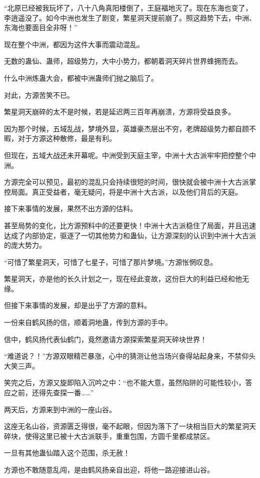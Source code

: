 \begin{this_body}
“北原已经被我玩坏了，八十八角真阳楼倒了，王庭福地灭了。现在东海也变了，李逍遥没了。如今中洲也发生了剧变，繁星洞天提前崩了。照这趋势下去，中洲、东海也要面目全非呀！”

现在整个中洲，都因为这件大事而震动混乱。

无数的蛊仙、蛊师，超级势力，大中小势力，都朝着洞天碎片世界蜂拥而去。

什么中洲炼蛊大会，都被中洲蛊师们抛之脑后了。

对此，方源苦笑不已。

繁星洞天崩碎的太不是时候，若是延迟两三百年再崩溃，方源将受益良多。

因为那个时候，五域乱战，梦境外显，英雄豪杰层出不穷，老牌超级势力都自顾不暇，对于方源这种散修，最是有利。

但现在，五域大战还未开幕呢。中洲受到天庭主宰，中洲十大古派牢牢把控整个中洲。

方源完全可以预见，最初的混乱只会持续很短的时间，很快就会被中洲十大古派掌控局面。真正受益者，毫无疑问，将是中洲十大古派，以及他们背后的天庭。

接下来事情的发展，果然不出方源的估料。

甚至局势的变化，比方源预料中的还要更快！中洲十大古派稳住了局面，并且迅速达成了内部协定，驱逐了一切其他势力和蛊仙，让方源深刻的认识到中洲十大古派的庞大势力。

“可惜了繁星洞天，可惜了七星子，可惜了那片梦境。”方源怅惘叹息。

繁星洞天，亦是他的长久计划之一，现在经此变故，这份巨大的利益已经和他无缘。

但接下来事情的发展，却是出乎了方源的意料。

一份来自鹤风扬的信，顺着洞地蛊，传到方源的手中。

信中，鹤风扬代表仙鹤门，竟然邀请方源探索繁星洞天碎块世界！

“难道说？！”方源双眼精芒暴涨，心中的猜测让他当场兴奋得站起身来，不禁仰头大笑三声。

笑完之后，方源又旋即陷入沉吟之中：“也不能大意，虽然陷阱的可能性较小，答应之前，还得先查探一番……”

两天后，方源来到中洲的一座山谷。

这座无名山谷，资源匮乏得很，毫不起眼，但因为落下了一块相当巨大的繁星洞天碎块，使得这里已被十大古派联手，重重包围，方圆千里都成禁区。

一旦有其他蛊仙踏入这个范围，杀无赦！

方源也不敢随意乱闯，是由鹤风扬亲自出迎，将他一路迎接进山谷。


\end{this_body}
